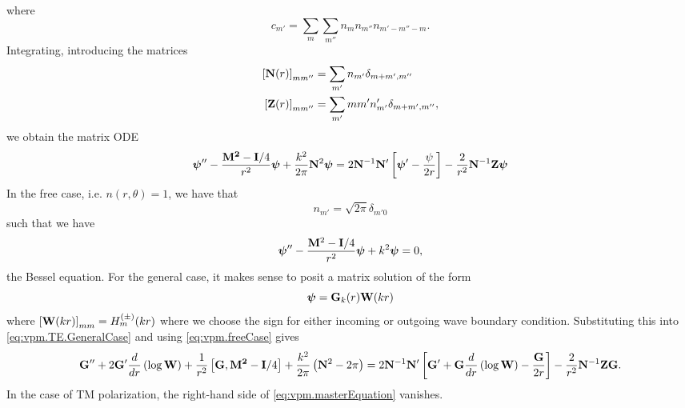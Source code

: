 where
  \begin{equation}
   c_{m'} = \sum_{m}\sum_{m''}n_mn_{m''}n_{m'-m''-m}.
  \end{equation}
Integrating, introducing the matrices
  \begin{subequations}
  \begin{align}
   \left[\mathbf{N}(r)\right]_{mm''}	&= \sum_{m'}n_{m'}\delta_{m+m',m''}	\\
   \left[\mathbf{Z}(r)\right]_{mm''}	&= \sum_{m'}mm'n_{m'}'\delta_{m+m',m''},
  \end{align}
  \end{subequations}
we obtain the matrix ODE
  \begin{equation}
  \label{eq:vpm.TE.GeneralCase}
  \boldsymbol{\psi}''-\frac{\mathbf{M^2}-\mathbf{I}/4}{r^2}\boldsymbol{\psi}+\frac{k^2}{2\pi}\mathbf{N}^2\boldsymbol{\psi}
    =
   2\mathbf{N}^{-1}\mathbf{N}'\left[\boldsymbol{\psi}'-\frac{\psi}{2r}\right]-\frac{2}{r^2}\mathbf{N}^{-1}\mathbf{Z}\boldsymbol{\psi}
  \end{equation}
In the free case, i.e. $n(r,\theta)=1$, we have that
  \begin{equation}
   n_{m'} = \sqrt{2\pi}\delta_{m'0}
  \end{equation}
such that we have
  \begin{equation}
    \label{eq:vpm.freeCase}
    \boldsymbol{\psi}''-\frac{\mathbf{M}^2-\mathbf{I}/4}{r^2}\boldsymbol{\psi}+k^2\boldsymbol{\psi}=0,
  \end{equation}
the Bessel equation. For the general case, it makes sense
to posit a matrix solution of the form
  \begin{equation}
   \boldsymbol{\psi}=\mathbf{G}_k(r)\mathbf{W}(kr)
  \end{equation}
where $\left[\mathbf{W}(kr)\right]_{mm}=H_m^{(\pm)}(kr)$ where
we choose the sign for either incoming or outgoing 
wave boundary condition. Substituting this into \eqref{eq:vpm.TE.GeneralCase}
and using \eqref{eq:vpm.freeCase} gives
  \begin{multline}
    \label{eq:vpm.masterEquation}
    \mathbf{G}''+2\mathbf{G}'\frac{d}{dr}\left(\log\mathbf{W}\right)+\frac{1}{r^2}\left[\mathbf{G},\mathbf{M^2}-\mathbf{I}/4\right]+\frac{k^2}{2\pi}\left(\mathbf{N}^2-2\pi\right)
      =
    2\mathbf{N}^{-1}\mathbf{N}'\left[\mathbf{G}'+\mathbf{G}\frac{d}{dr}\left(\log\mathbf{W}\right)-\frac{\mathbf{G}}{2r}\right]-\frac{2}{r^2}\mathbf{N}^{-1}\mathbf{ZG}.
  \end{multline}
In the case of TM polarization, the right-hand side 
of \eqref{eq:vpm.masterEquation} vanishes. 

